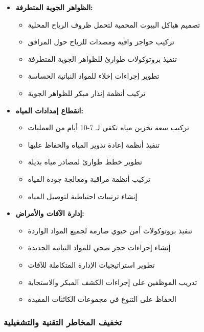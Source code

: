 \begin{itemize}
    \item \textbf{الظواهر الجوية المتطرفة:}
    \begin{itemize}
        \item تصميم هياكل البيوت المحمية لتحمل ظروف الرياح المحلية
        \item تركيب حواجز واقية ومصدات للرياح حول المرافق
        \item تنفيذ بروتوكولات طوارئ للظواهر الجوية المتطرفة
        \item تطوير إجراءات إخلاء للمواد النباتية الحساسة
        \item تركيب أنظمة إنذار مبكر للظواهر الجوية
    \end{itemize}
    
    \item \textbf{انقطاع إمدادات المياه:}
    \begin{itemize}
        \item تركيب سعة تخزين مياه تكفي لـ 7-10 أيام من العمليات
        \item تنفيذ أنظمة إعادة تدوير المياه والحفاظ عليها
        \item تطوير خطط طوارئ لمصادر مياه بديلة
        \item تركيب أنظمة مراقبة ومعالجة جودة المياه
        \item إنشاء ترتيبات احتياطية لتوصيل المياه
    \end{itemize}
    
    \item \textbf{إدارة الآفات والأمراض:}
    \begin{itemize}
        \item تنفيذ بروتوكولات أمن حيوي صارمة لجميع المواد الواردة
        \item إنشاء إجراءات حجر صحي للمواد النباتية الجديدة
        \item تطوير استراتيجيات الإدارة المتكاملة للآفات
        \item تدريب الموظفين على إجراءات الكشف المبكر والاستجابة
        \item الحفاظ على التنوع في مجموعات الكائنات المفيدة
    \end{itemize}
\end{itemize}

\subsubsection{تخفيف المخاطر التقنية والتشغيلية}

